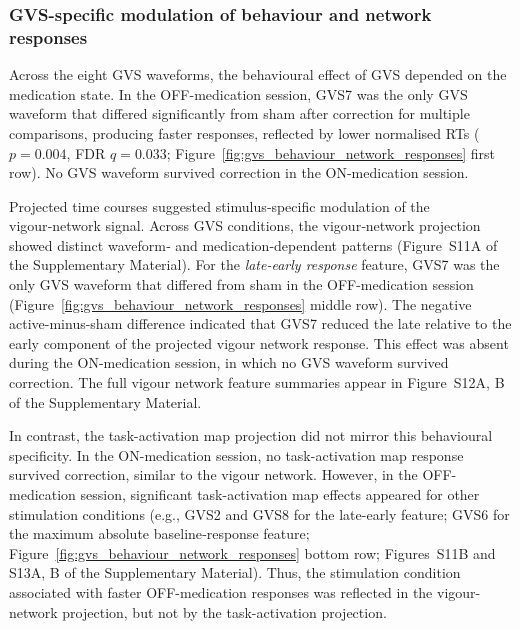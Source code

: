 \documentclass[utf8]{FrontiersinHarvard}
\begin{document}
\subsubsection{GVS-specific modulation of behaviour and network responses}
Across the eight GVS waveforms, the behavioural effect of GVS depended on the medication state. In the OFF-medication session, GVS7 was the only GVS waveform that differed significantly from sham after correction for multiple comparisons, producing faster responses, reflected by lower normalised RTs (\(p = 0.004\), FDR \(q = 0.033\); Figure~\ref{fig:gvs_behaviour_network_responses} first row). No GVS waveform survived correction in the ON-medication session.

Projected time courses suggested stimulus‑specific modulation of the vigour‑network signal. Across GVS conditions, the vigour‑network projection showed distinct waveform‑ and medication‑dependent patterns (Figure~S11A of the Supplementary Material). For the \textit{late-early response} feature, GVS7 was the only GVS waveform that differed from sham in the OFF-medication session (Figure~\ref{fig:gvs_behaviour_network_responses} middle row). The negative active-minus-sham difference indicated that GVS7 reduced the late relative to the early component of the projected vigour network response. This effect was absent during the ON-medication session, in which no GVS waveform survived correction. The full vigour network feature summaries appear in Figure~S12A, B of the Supplementary Material.

In contrast, the task-activation map projection did not mirror this behavioural specificity.  In the ON-medication session, no task-activation map response survived correction, similar to the vigour network. However, in the OFF-medication session, significant task-activation map effects appeared for other stimulation conditions (e.g., GVS2 and GVS8 for the late-early feature; GVS6 for the maximum absolute baseline‑response feature; Figure~\ref{fig:gvs_behaviour_network_responses} bottom row; Figures~S11B and S13A, B of the Supplementary Material). Thus, the stimulation condition associated with faster OFF-medication responses was reflected in the vigour-network projection, but not by the task-activation projection.
\end{document}
